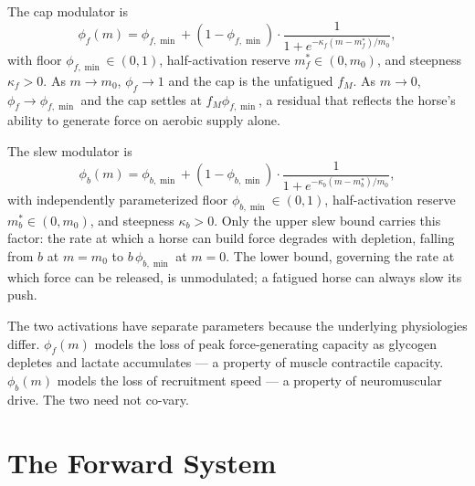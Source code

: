 \documentclass[11pt]{article}
\begin{document}
The cap modulator is
\begin{equation}
\phi_f(m) = \phi_{f,\min} + (1 - \phi_{f,\min}) \cdot \frac{1}{1 + e^{-\kappa_f(m - m_f^*)/m_0}},
\end{equation}
with floor $\phi_{f,\min} \in (0, 1)$, half-activation reserve $m_f^* \in (0, m_0)$, and steepness $\kappa_f > 0$. As $m \to m_0$, $\phi_f \to 1$ and the cap is the unfatigued $f_M$. As $m \to 0$, $\phi_f \to \phi_{f,\min}$ and the cap settles at $f_M \phi_{f,\min}$, a residual that reflects the horse's ability to generate force on aerobic supply alone.

The slew modulator is
\begin{equation}
\phi_b(m) = \phi_{b,\min} + (1 - \phi_{b,\min}) \cdot \frac{1}{1 + e^{-\kappa_b(m - m_b^*)/m_0}},
\end{equation}
with independently parameterized floor $\phi_{b,\min} \in (0, 1)$, half-activation reserve $m_b^* \in (0, m_0)$, and steepness $\kappa_b > 0$. Only the upper slew bound carries this factor: the rate at which a horse can build force degrades with depletion, falling from $b$ at $m = m_0$ to $b\, \phi_{b,\min}$ at $m = 0$. The lower bound, governing the rate at which force can be released, is unmodulated; a fatigued horse can always slow its push.

The two activations have separate parameters because the underlying physiologies differ. $\phi_f(m)$ models the loss of peak force-generating capacity as glycogen depletes and lactate accumulates --- a property of muscle contractile capacity. $\phi_b(m)$ models the loss of recruitment speed --- a property of neuromuscular drive. The two need not co-vary.

\section{The Forward System}\label{sec:forward}
\end{document}
